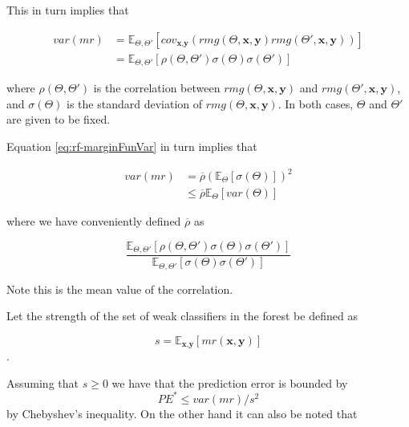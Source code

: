\documentclass{article}%
\newcommand{\Expect}{{\mathbb{E}}}
\theoremstyle{definition}
\begin{document}
This in turn implies that

\begin{equation}\label{eq:rf-marginFunVar}
\begin{split}
var(mr) & =  \Expect_{\Theta, \Theta'} 
\left[ 
cov_{\textbf{x},\textbf{y}}
(rmg(\Theta,\textbf{x},\textbf{y} )rmg(\Theta',\textbf{x},\textbf{y} )) 
\right] \\
& =  \Expect_{\Theta, \Theta'}
\left[ 
\rho(\Theta, \Theta')\sigma(\Theta)\sigma(\Theta')
\right] 
\end{split}
\end{equation}

where $ \rho(\Theta, \Theta')$ is the correlation between $rmg(\Theta,\textbf{x},\textbf{y})$ and $rmg(\Theta',\textbf{x},\textbf{y})$, and $\sigma(\Theta)$ is the standard deviation of $rmg(\Theta,\textbf{x},\textbf{y})$. In both cases, $\Theta$ and $\Theta'$ are given to be fixed. 

Equation \ref{eq:rf-marginFunVar} in turn implies that 

\begin{equation}\label{eq:rf-varianceBound}
\begin{split}
var(mr) & =  \overline{\rho} (\Expect_{\Theta}\left[ \sigma(\Theta)\right] )^2 \\
& \leq  \overline{\rho} \Expect_{\Theta} \left[ var(\Theta) \right] 
\end{split}
\end{equation}

where we have conveniently defined $\overline{\rho}$ as 

\begin{equation}\label{eq:rf-meanCorrelation}
\frac{\Expect_{\Theta, \Theta'} \left[ \rho(\Theta, \Theta') \sigma(\Theta) \sigma(\Theta')\right]}
{\Expect_{\Theta, \Theta'} \left[ \sigma(\Theta) \sigma(\Theta')\right]}
\end{equation}

Note this is the mean value of the correlation.

Let the strength of the set of weak classifiers in the forest be defined as 

$$s =  \Expect_{\textbf{x},\textbf{y}} \left[ mr(\textbf{x},\textbf{y} ) \right] $$.\label{eq:rf-strength}

Assuming that $s \geq 0$ we have that the prediction error is bounded by 
\begin{equation}\label{eq:rf-predictiveErrorBound1}
PE^* \leq var(mr)/s^2
\end{equation}
by Chebyshev's inequality. On the other hand it can also be noted that
\end{document}
